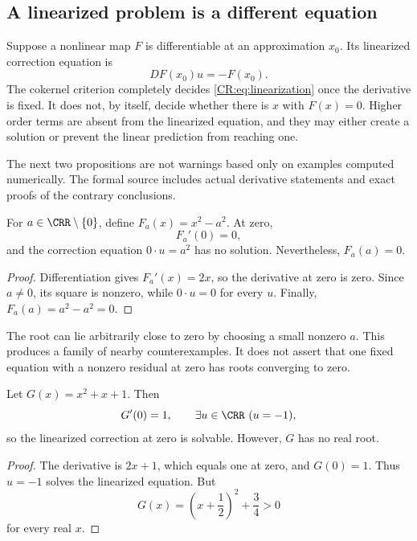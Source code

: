 \subsection{A linearized problem is a different equation}
Suppose a nonlinear map $F$ is differentiable at an approximation $x_0$. Its linearized correction equation is
\begin{equation}\label{CR:eq:linearization}
DF(x_0)u=-F(x_0).
\end{equation}
The cokernel criterion completely decides \eqref{CR:eq:linearization} once the derivative is fixed. It does not, by itself, decide whether there is $x$ with $F(x)=0$. Higher order terms are absent from the linearized equation, and they may either create a solution or prevent the linear prediction from reaching one.

The next two propositions are not warnings based only on examples computed numerically. The formal source includes actual derivative statements and exact proofs of the contrary conclusions.

\begin{CRproposition}\label{CR:prop:nonlinear-root}
For $a\in\CRR\setminus\{0\}$, define $F_a(x)=x^2-a^2$. At zero,
\[
F_a'(0)=0,
\]
and the correction equation $0\cdot u=a^2$ has no solution. Nevertheless, $F_a(a)=0$.
\end{CRproposition}
\begin{proof}
Differentiation gives $F_a'(x)=2x$, so the derivative at zero is zero. Since $a\ne0$, its square is nonzero, while $0\cdot u=0$ for every $u$. Finally, $F_a(a)=a^2-a^2=0$.
\end{proof}

The root can lie arbitrarily close to zero by choosing a small nonzero $a$. This produces a family of nearby counterexamples. It does not assert that one fixed equation with a nonzero residual at zero has roots converging to zero.

\begin{CRproposition}\label{CR:prop:no-real-root}
Let $G(x)=x^2+x+1$. Then
\[
G'(0)=1,\qquad \exists u\in\CRR\ (u=-1),
\]
so the linearized correction at zero is solvable. However, $G$ has no real root.
\end{CRproposition}
\begin{proof}
The derivative is $2x+1$, which equals one at zero, and $G(0)=1$. Thus $u=-1$ solves the linearized equation. But
\[
G(x)=\left(x+\frac12\right)^2+\frac34>0
\]
for every real $x$.
\end{proof}

